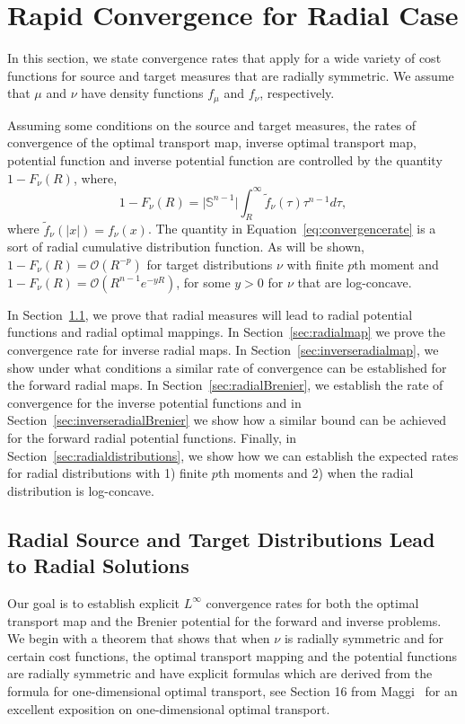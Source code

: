 \documentclass{amsart}
\theoremstyle{lemma}
\theoremstyle{remark}
\begin{document}
\section{Rapid Convergence for Radial Case}\label{sec:radial}
In this section, we state convergence rates that apply for a wide variety of cost functions for source and target measures that are radially symmetric. We assume that $\mu$ and $\nu$ have density functions $f_{\mu}$ and $f_{\nu}$, respectively.

Assuming some conditions on the source and target measures, the rates of convergence of the optimal transport map, inverse optimal transport map, potential function and inverse potential function are controlled by the quantity $1 - F_{\nu}(R)$, where,
\begin{equation}\label{eq:convergencerate}
1 - F_{\nu}(R) = \vert \mathbb{S}^{n-1} \vert \int_{R}^{\infty} \tilde{f}_{\nu}(\tau) \tau^{n-1} d\tau,
\end{equation}
where $\tilde{f}_{\nu}(\vert x \vert) = f_{\nu}(x)$. The quantity in Equation~\eqref{eq:convergencerate} is a sort of radial cumulative distribution function. As will be shown, $1 - F_{\nu}(R) = \mathcal{O}(R^{-p})$ for target distributions $\nu$ with finite $p$th moment and $1 - F_{\nu}(R) = \mathcal{O}(R^{n-1} e^{-y R})$, for some $y>0$ for $\nu$ that are log-concave.

In Section~\ref{sec:radialsolutions}, we prove that radial measures will lead to radial potential functions and radial optimal mappings. In Section~\ref{sec:radialmap} we prove the convergence rate for inverse radial maps. In Section~\ref{sec:inverseradialmap}, we show under what conditions a similar rate of convergence can be established for the forward radial maps. In Section~\ref{sec:radialBrenier}, we establish the rate of convergence for the inverse potential functions and in Section~\ref{sec:inverseradialBrenier} we show how a similar bound can be achieved for the forward radial potential functions. Finally, in Section~\ref{sec:radialdistributions}, we show how we can establish the expected rates for radial distributions with 1) finite $p$th moments and 2) when the radial distribution is log-concave.

\subsection{Radial Source and Target Distributions Lead to Radial Solutions}\label{sec:radialsolutions}

Our goal is to establish explicit $L^{\infty}$ convergence rates for both the optimal transport map and the Brenier potential for the forward and inverse problems. We begin with a theorem that shows that when $\nu$ is radially symmetric and for certain cost functions, the optimal transport mapping and the potential functions are radially symmetric and have explicit formulas which are derived from the formula for one-dimensional optimal transport, see Section 16 from Maggi~\cite{maggi} for an excellent exposition on one-dimensional optimal transport.
\end{document}
